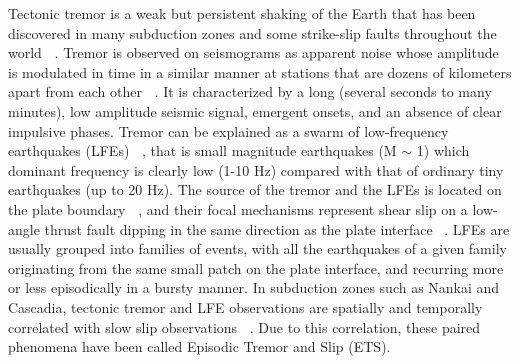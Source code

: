 \documentclass[draft]{agujournal2019}
\begin{document}
Tectonic tremor is a weak but persistent shaking of the Earth that has been discovered in many subduction zones and some strike-slip faults throughout the world \textbf{~\cite{BER_2011}}. Tremor is observed on seismograms as apparent noise whose amplitude is modulated in time in a similar manner at stations that are dozens of kilometers apart from each other \textbf{~\cite{OBA_2002}}. It is characterized by a long (several seconds to many minutes), low amplitude seismic signal, emergent onsets, and an absence of clear impulsive phases. Tremor can be explained as a swarm of low-frequency earthquakes (LFEs) \textbf{~\cite{SHE_2007_nature}}, that is small magnitude earthquakes (M $\sim$ 1) which dominant frequency is clearly low (1-10 Hz) compared with that of ordinary tiny earthquakes (up to 20 Hz). The source of the tremor and the LFEs is located on the plate boundary \textbf{~\cite{SHE_2006,BOS_2012,AUD_2016}}, and their focal mechanisms represent shear slip on a low-angle thrust fault dipping in the same direction as the plate interface ~\textbf{\cite{IDE_2007_GRL,BOS_2012,ROY_2014}}. LFEs are usually grouped into families of events, with all the earthquakes of a given family originating from the same small patch on the plate interface, and recurring more or less episodically in a bursty manner. In subduction zones such as Nankai and Cascadia, tectonic tremor and LFE observations are spatially and temporally correlated with slow slip observations \textbf{~\cite{ROG_2003,OBA_2004}}. Due to this correlation, these paired phenomena have been called Episodic Tremor and Slip (ETS). \\
\end{document}
